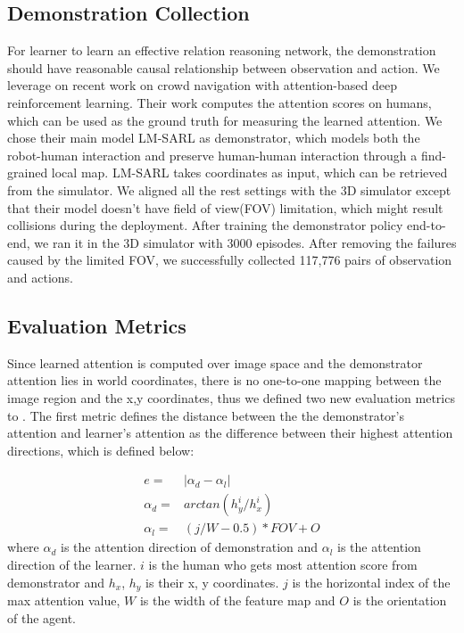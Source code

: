 \documentclass[10pt,twocolumn,letterpaper]{article}
\begin{document}
\subsection{Demonstration Collection}
For learner to learn an effective relation reasoning network, the demonstration should have reasonable causal relationship between observation and action. We leverage on recent work on crowd navigation \cite{chen_crowd-robot_2018} with attention-based deep reinforcement learning. Their work computes the attention scores on humans, which can be used as the ground truth for measuring the learned attention. We chose their main model LM-SARL as demonstrator, which models both the robot-human interaction and preserve human-human interaction through a find-grained local map. LM-SARL takes coordinates as input, which can be retrieved from the simulator. We aligned all the rest settings with the 3D simulator except that their model doesn't have field of view(FOV) limitation, which might result collisions during the deployment. After training the demonstrator policy end-to-end, we ran it in the 3D simulator with 3000 episodes. After removing the failures caused by the limited FOV, we successfully collected 117,776 pairs of observation and actions. 

\subsection{Evaluation Metrics} \label{subsection:evaluation_metrics}
Since learned attention is computed over image space and the demonstrator attention lies in world coordinates, there is no one-to-one mapping between the image region and the x,y coordinates, thus we defined two new evaluation metrics to . The first metric defines the distance between the  the demonstrator's attention and learner's attention as the difference between their highest attention directions, which is defined below:
    
\begin{equation}
\begin{aligned}
    e =& |\alpha_d - \alpha_l| \\ 
    \alpha_d =& arctan(h_y^i/h_x^i) \\
    \alpha_l =& (j / W - 0.5) * FOV + O
\end{aligned}
\end{equation}
where $\alpha_d$ is the attention direction of demonstration and $\alpha_l$ is the attention direction of the learner.
$i$ is the human who gets most attention score from demonstrator and $h_x$, $h_y$ is their x, y coordinates. $j$ is the horizontal index of the max attention value, $W$ is the width of the feature map and $O$ is the orientation of the agent. 
\end{document}
